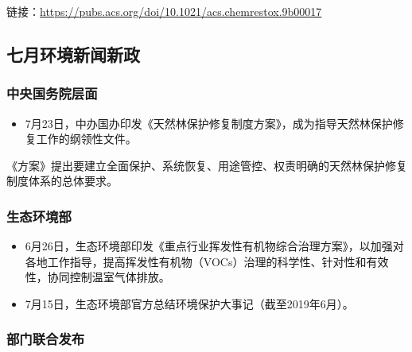 \documentclass[]{book}
\providecommand{\tightlist}{%
  \setlength{\itemsep}{0pt}\setlength{\parskip}{0pt}}
\begin{document}
链接：\url{https://pubs.acs.org/doi/10.1021/acs.chemrestox.9b00017}

\hypertarget{ux4e03ux6708ux73afux5883ux65b0ux95fbux65b0ux653f}{%
\subsection*{七月环境新闻新政}\label{ux4e03ux6708ux73afux5883ux65b0ux95fbux65b0ux653f}}

\hypertarget{ux4e2dux592eux56fdux52a1ux9662ux5c42ux9762-4}{%
\subsubsection*{中央国务院层面}\label{ux4e2dux592eux56fdux52a1ux9662ux5c42ux9762-4}}

\begin{itemize}
\tightlist
\item
  7月23日，中办国办印发《天然林保护修复制度方案》，成为指导天然林保护修复工作的纲领性文件。
\end{itemize}

《方案》提出要建立全面保护、系统恢复、用途管控、权责明确的天然林保护修复制度体系的总体要求。

\hypertarget{ux751fux6001ux73afux5883ux90e8-5}{%
\subsubsection*{生态环境部}\label{ux751fux6001ux73afux5883ux90e8-5}}

\begin{itemize}
\item
  6月26日，生态环境部印发《重点行业挥发性有机物综合治理方案》，以加强对各地工作指导，提高挥发性有机物（VOCs）治理的科学性、针对性和有效性，协同控制温室气体排放。
\item
  7月15日，生态环境部官方总结环境保护大事记（截至2019年6月）。
\end{itemize}

\hypertarget{ux90e8ux95e8ux8054ux5408ux53d1ux5e03-7}{%
\subsubsection*{部门联合发布}\label{ux90e8ux95e8ux8054ux5408ux53d1ux5e03-7}}
\end{document}
